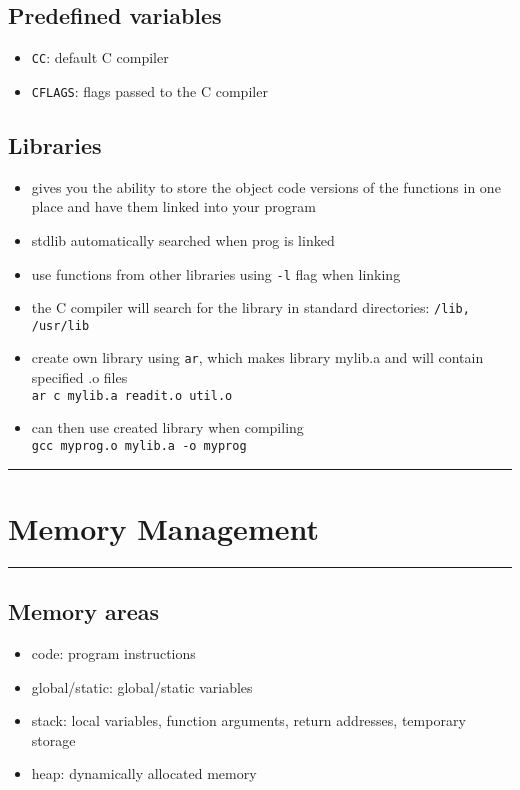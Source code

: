 \documentclass[10pt, multicolumn, a4paper]{article}
\begin{document}
\begin{multicols}{2}
	\subsection*{Predefined variables}
	\begin{itemize}
	\item \verb|CC|: default C compiler
	\item \verb|CFLAGS|: flags passed to the C compiler
	\end{itemize}
	\subsection*{Libraries}
	\begin{itemize}
	\item gives you the ability to store the object code versions of the functions in one place and have them linked into your program
	\item stdlib automatically searched when prog is linked
	\item use functions from other libraries using \verb|-l| flag when linking
	\item the C compiler will search for the library in standard directories: \verb|/lib, /usr/lib|
	\item create own library using \verb|ar|, which makes library mylib.a and will contain specified .o files
		\\ \verb|ar c mylib.a readit.o util.o|
	\item can then use created library when compiling
		\\ \verb|gcc myprog.o mylib.a -o myprog|
	\end{itemize}
\end{multicols}


\hrule
\section{Memory Management}
\hrule 

\begin{multicols}{2}
	\subsection*{Memory areas}
	\begin{itemize}
	\item code: program instructions
	\item global/static: global/static variables
	\item stack: local variables, function arguments, return addresses, temporary storage
	\item heap: dynamically allocated memory
	\end{itemize}
\end{multicols}

\end{document}
